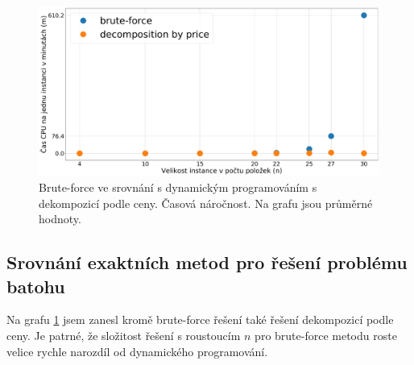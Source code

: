 \documentclass[11pt]{article}
\begin{document}
\begin{figure}[h]\centering
	\includegraphics[scale=0.2]{img/tBavg}
 	\caption[1]{Brute-force ve srovnání s dynamickým programováním s dekompozicí podle ceny. Časová náročnost. Na grafu jsou průměrné hodnoty.}\label{fig:1}
 \end{figure} 	

\subsection{Srovnání exaktních metod pro řešení problému batohu}
Na grafu \ref{fig:1} jsem zanesl kromě brute-force řešení také řešení dekompozicí podle ceny. Je patrné, že složitost řešení s roustoucím $n$ pro brute-force metodu roste velice rychle narozdíl od dynamického programování. 
\end{document}

